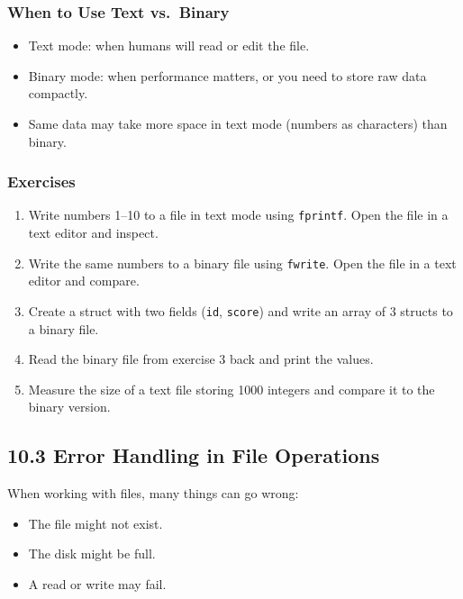 \documentclass[
  letterpaper,
  DIV=11,
  numbers=noendperiod]{scrreprt}
\providecommand{\tightlist}{%
  \setlength{\itemsep}{0pt}\setlength{\parskip}{0pt}}
\begin{document}
\subsubsection{When to Use Text
vs.~Binary}\label{when-to-use-text-vs.-binary}

\begin{itemize}
\tightlist
\item
  Text mode: when humans will read or edit the file.
\item
  Binary mode: when performance matters, or you need to store raw data
  compactly.
\item
  Same data may take more space in text mode (numbers as characters)
  than binary.
\end{itemize}

\subsubsection{Exercises}\label{exercises-46}

\begin{enumerate}
\def\labelenumi{\arabic{enumi}.}
\tightlist
\item
  Write numbers 1--10 to a file in text mode using \texttt{fprintf}.
  Open the file in a text editor and inspect.
\item
  Write the same numbers to a binary file using \texttt{fwrite}. Open
  the file in a text editor and compare.
\item
  Create a struct with two fields (\texttt{id}, \texttt{score}) and
  write an array of 3 structs to a binary file.
\item
  Read the binary file from exercise 3 back and print the values.
\item
  Measure the size of a text file storing 1000 integers and compare it
  to the binary version.
\end{enumerate}

\subsection{10.3 Error Handling in File
Operations}\label{error-handling-in-file-operations}

When working with files, many things can go wrong:

\begin{itemize}
\tightlist
\item
  The file might not exist.
\item
  The disk might be full.
\item
  A read or write may fail.
\end{itemize}
\end{document}
